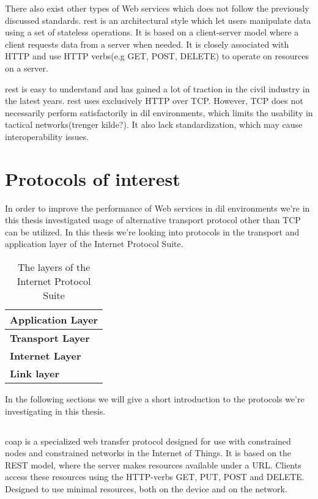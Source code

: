 There also exist other types of Web services which does not follow the
previously discussed standards. \gls{rest} is an architectural style which let
users manipulate data using a set of stateless operations. It is based on a
client-server model where a client requests data from a server when needed. It
is closely associated with HTTP and use HTTP verbs(e.g GET, POST,
DELETE) to operate on resources on a server.

 \gls{rest} is easy to understand and has gained a lot of traction in the
civil  industry in the latest years. \gls{rest} uses exclusively HTTP over
TCP.  However, TCP does not necessarily perform satisfactorily in \gls{dil}
environments, which limits the usability in tactical networks(trenger kilde?).
It also lack standardization, which may cause interoperability issues.

\section{Protocols of interest}

In order to improve the performance of Web services in \gls{dil} environments
we're in this thesis investigated usage of alternative transport protocol
other than TCP can be utilized. In this thesis we're looking into protocols in
the transport and application layer of the Internet Protocol Suite\cite{rfc-1122}.

\begin{table}[h]
\begin{tabularx}{\textwidth}{| X |}
\hline
  \textbf{Application Layer} \\ \hline
  \textbf{Transport Layer} \\ \hline
  \textbf{Internet Layer} \\ \hline
  \textbf{Link layer} \\ \hline
\end{tabularx}
\caption{The layers of the Internet Protocol Suite}
\end{table}


In the following sections we will give a short introduction to the protocols we're
investigating in this thesis.



\subsection{}

\gls{coap} is a specialized web transfer protocol designed for use with
constrained nodes and constrained networks in the Internet of Things. It is
based on the REST model, where the server makes resources available  under a
URL. Clients access these resources using the HTTP-verbs GET, PUT, POST and
DELETE. Designed to use minimal resources, both on the device and on the
network.

